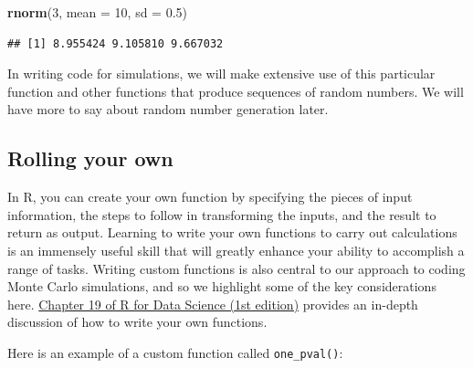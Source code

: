 \documentclass[
]{book}
\newenvironment{Shaded}{\begin{snugshade}}{\end{snugshade}}
\newcommand{\AttributeTok}[1]{\textcolor[rgb]{0.13,0.29,0.53}{#1}}
\newcommand{\ControlFlowTok}[1]{\textcolor[rgb]{0.13,0.29,0.53}{\textbf{#1}}}
\newcommand{\DecValTok}[1]{\textcolor[rgb]{0.00,0.00,0.81}{#1}}
\newcommand{\FloatTok}[1]{\textcolor[rgb]{0.00,0.00,0.81}{#1}}
\newcommand{\FunctionTok}[1]{\textcolor[rgb]{0.13,0.29,0.53}{\textbf{#1}}}
\newcommand{\NormalTok}[1]{#1}
\newcommand{\OtherTok}[1]{\textcolor[rgb]{0.56,0.35,0.01}{#1}}
\newcommand{\SpecialCharTok}[1]{\textcolor[rgb]{0.81,0.36,0.00}{\textbf{#1}}}
\begin{document}
\begin{Shaded}
\begin{Highlighting}[]
\FunctionTok{rnorm}\NormalTok{(}\DecValTok{3}\NormalTok{, }\AttributeTok{mean =} \DecValTok{10}\NormalTok{, }\AttributeTok{sd =} \FloatTok{0.5}\NormalTok{)}
\end{Highlighting}
\end{Shaded}

\begin{verbatim}
## [1] 8.955424 9.105810 9.667032
\end{verbatim}

In writing code for simulations, we will make extensive use of this particular function and other functions that produce sequences of random numbers.
We will have more to say about random number generation later.

\subsection{Rolling your own}\label{rolling-your-own}

In R, you can create your own function by specifying the pieces of input information, the steps to follow in transforming the inputs, and the result to return as output.
Learning to write your own functions to carry out calculations is an immensely useful skill that will greatly enhance your ability to accomplish a range of tasks.
Writing custom functions is also central to our approach to coding Monte Carlo simulations, and so we highlight some of the key considerations here.
\href{https://r4ds.had.co.nz/functions.html}{Chapter 19 of R for Data Science (1st edition)} provides an in-depth discussion of how to write your own functions.

Here is an example of a custom function called \texttt{one\_pval()}:

\begin{Shaded}
\end{Shaded}
\end{document}
